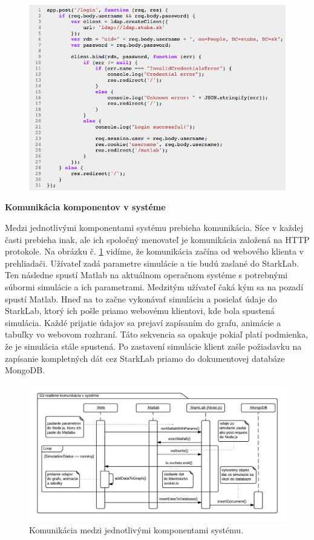 \begin{figure}[H]
  \centering
  \includegraphics[scale=0.7]{img/code/ldap-login.png}
\end{figure}

\noindent \textbf{Komunikácia komponentov v systéme}

Medzi jednotlivými komponentami systému prebieha komunikácia. Síce v každej časti prebieha inak, ale ich spoločný menovateľ je komunikácia založená na HTTP protokole. Na obrázku č. \ref{img-sequence-realtime} vidíme, že komunikácia začína od webového klienta v prehliadači. Užívateľ zadá parametre simulácie a tie budú zaslané do StarkLab. Ten následne spustí Matlab na aktuálnom operačnom systéme s potrebnými súbormi simulácie a ich parametrami. Medzitým užívateľ čaká kým sa na pozadí spustí Matlab. Hneď na to začne vykonávať simuláciu a posielať údaje do StarkLab, ktorý ich pošle priamo webovému klientovi, kde bola spustená simulácia. Každé prijatie údajov sa prejaví zapísaním do grafu, animácie a tabuľky vo webovom rozhraní. Táto sekvencia sa opakuje pokiaľ platí podmienka, že je simulácia stále spustená. Po zastavení simulácie klient zašle požiadavku na zapísanie kompletných dát cez StarkLab priamo do dokumentovej databáze MongoDB.

\begin{figure}[H]
  \centering
  \includegraphics[scale=0.35]{img/diagrams/sequence-realtime-communication.png}
  \caption{Komunikácia medzi jednotlivými komponentami systému.}
  \label{img-sequence-realtime}
\end{figure}

